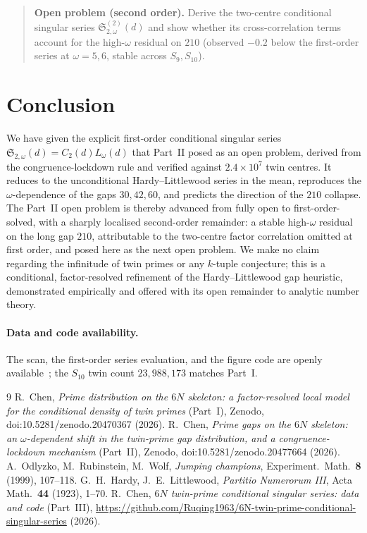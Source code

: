\documentclass[11pt]{article}
\begin{document}
\begin{quote}
\textbf{Open problem (second order).} Derive the two-centre conditional singular
series $\mathfrak{S}^{(2)}_{2,\omega}(d)$ and show whether its cross-correlation
terms account for the high-$\omega$ residual on $210$
(observed $-0.2$ below the first-order series at $\omega=5,6$, stable across
$S_9,S_{10}$).
\end{quote}

\section{Conclusion}

We have given the explicit first-order conditional singular series
$\mathfrak{S}_{2,\omega}(d)=C_2(d)L_\omega(d)$ that Part~II posed as an open
problem, derived from the congruence-lockdown rule and verified against
$2.4\times10^{7}$ twin centres. It reduces to the unconditional
Hardy--Littlewood series in the mean, reproduces the $\omega$-dependence of the
gaps $30,42,60$, and predicts the direction of the $210$ collapse. The Part~II
open problem is thereby advanced from fully open to first-order-solved, with a
sharply localised second-order remainder: a stable high-$\omega$ residual on the
long gap $210$, attributable to the two-centre factor correlation omitted at
first order, and posed here as the next open problem. We make no claim regarding
the infinitude of twin primes or any $k$-tuple conjecture; this is a conditional,
factor-resolved refinement of the Hardy--Littlewood gap heuristic, demonstrated
empirically and offered with its open remainder to analytic number theory.

\paragraph{Data and code availability.}
The scan, the first-order series evaluation, and the figure code are openly
available~\cite{repo2}; the $S_{10}$ twin count $23{,}988{,}173$ matches Part~I.

\begin{thebibliography}{9}
 R.~Chen, \emph{Prime distribution on the $6N$ skeleton: a
factor-resolved local model for the conditional density of twin primes} (Part~I),
Zenodo, doi:10.5281/zenodo.20470367 (2026).
 R.~Chen, \emph{Prime gaps on the $6N$ skeleton: an
$\omega$-dependent shift in the twin-prime gap distribution, and a
congruence-lockdown mechanism} (Part~II), Zenodo, doi:10.5281/zenodo.20477664 (2026).
 A.~Odlyzko, M.~Rubinstein, M.~Wolf, \emph{Jumping champions},
Experiment.\ Math.\ \textbf{8} (1999), 107--118.
 G.~H.~Hardy, J.~E.~Littlewood, \emph{Partitio Numerorum III}, Acta
Math.\ \textbf{44} (1923), 1--70.
 R.~Chen, \emph{$6N$ twin-prime conditional singular series:
data and code} (Part~III),
\url{https://github.com/Ruqing1963/6N-twin-prime-conditional-singular-series} (2026).
\end{thebibliography}
\end{document}
